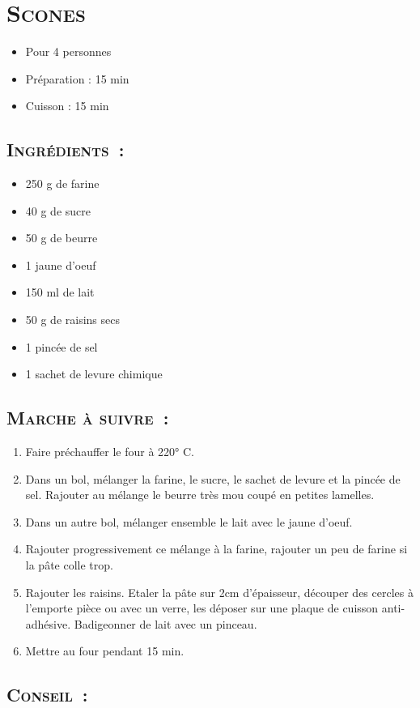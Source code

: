 \section[\normalsize{Scones}]{\LARGE{\textsc{Scones}}}		%


\begin{itemize}
\item Pour 4 personnes
\item Préparation : 15 min
\item Cuisson : 15 min
\end{itemize}

\subsection*{\textsc{Ingr\'edients~:}}

\begin{itemize}

\item 250 g de farine
\item 40 g de sucre
\item 50 g de beurre
\item 1 jaune d'oeuf
\item 150 ml de lait
\item 50 g de raisins secs
\item 1 pinc\'ee de sel
\item 1 sachet de levure chimique
\end{itemize}


\subsection*{\textsc{Marche \`a suivre~:}}

\begin{enumerate}
\item Faire pr\'echauffer le four \`a 220° C.
\item Dans un bol, m\'elanger la farine, le sucre, le sachet de levure et la pinc\'ee de sel. Rajouter au m\'elange le beurre tr\`es mou coup\'e en petites lamelles.
\item Dans un autre bol, m\'elanger ensemble le lait avec le jaune d'oeuf.
\item Rajouter progressivement ce m\'elange \`a la farine, rajouter un peu de farine si la p\^ate colle trop.
\item Rajouter les raisins. Etaler la p\^ate sur 2cm d'\'epaisseur, d\'ecouper des cercles \`a l'emporte pi\`ece ou avec un verre, les d\'eposer sur une plaque de cuisson anti-adh\'esive. Badigeonner de lait avec un pinceau.  
\item Mettre au four pendant 15 min.
\end{enumerate}
\subsection*{\textsc{Conseil~:}}
